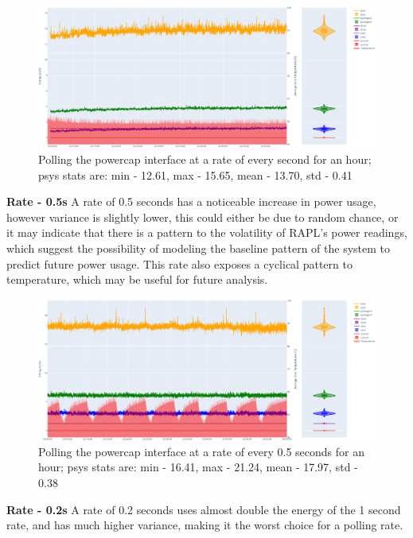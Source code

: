 \begin{figure}[H]
    \centering
    \includegraphics[width=15cm]{figures/implementation/control_sytemd10}
    \caption{Polling the powercap interface at a rate of every second for an hour; psys stats are: min - 12.61, max - 15.65, mean - 13.70, std - 0.41}
    \label{fig:systemd10ratetest}
\end{figure}

\textbf{Rate - 0.5s}
A rate of 0.5 seconds has a noticeable increase in power usage, however variance is slightly lower, this could either be
due to random chance, or it may indicate that there is a pattern to the volatility of RAPL's power readings, which
suggest the possibility of modeling the baseline pattern of the system to predict future power usage.
This rate also exposes a cyclical pattern to temperature, which may be useful for future analysis.

\begin{figure}[H]
    \centering
    \includegraphics[width=15cm]{figures/implementation/control_systemd05}
    \caption{Polling the powercap interface at a rate of every 0.5 seconds for an hour; psys stats are: min - 16.41, max - 21.24, mean - 17.97, std - 0.38}
    \label{fig:systemd05ratetest}
\end{figure}

\textbf{Rate - 0.2s}
A rate of 0.2 seconds uses almost double the energy of the 1 second rate, and has much higher variance, making it the
worst choice for a polling rate.

